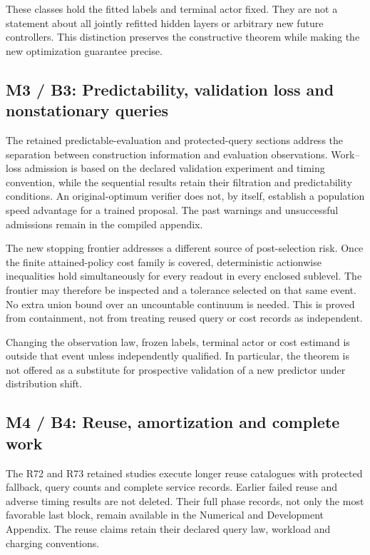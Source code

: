 \documentclass[ecta,nameyear,draft]{econsocart}
\begin{document}
These classes hold the fitted labels and terminal actor fixed. They are
not a statement about all jointly refitted hidden layers or arbitrary
new future controllers. This distinction preserves the constructive
theorem while making the new optimization guarantee precise.

\hypertarget{m3-b3-predictability-validation-loss-and-nonstationary-queries}{%
\subsection{M3 / B3: Predictability, validation loss and nonstationary
queries}\label{m3-b3-predictability-validation-loss-and-nonstationary-queries}}

The retained predictable-evaluation and protected-query sections address
the separation between construction information and evaluation
observations. Work--loss admission is based on the declared validation
experiment and timing convention, while the sequential results retain
their filtration and predictability conditions. An original-optimum
verifier does not, by itself, establish a population speed advantage for
a trained proposal. The past warnings and unsuccessful admissions remain
in the compiled appendix.

The new stopping frontier addresses a different source of post-selection
risk. Once the finite attained-policy cost family is covered,
deterministic actionwise inequalities hold simultaneously for every
readout in every enclosed sublevel. The frontier may therefore be
inspected and a tolerance selected on that same event. No extra union
bound over an uncountable continuum is needed. This is proved from
containment, not from treating reused query or cost records as
independent.

Changing the observation law, frozen labels, terminal actor or cost
estimand is outside that event unless independently qualified. In
particular, the theorem is not offered as a substitute for prospective
validation of a new predictor under distribution shift.

\hypertarget{m4-b4-reuse-amortization-and-complete-work}{%
\subsection{M4 / B4: Reuse, amortization and complete
work}\label{m4-b4-reuse-amortization-and-complete-work}}

The R72 and R73 retained studies execute longer reuse catalogues with
protected fallback, query counts and complete service records. Earlier
failed reuse and adverse timing results are not deleted. Their full
phase records, not only the most favorable last block, remain available
in the Numerical and Development Appendix. The reuse claims retain their
declared query law, workload and charging conventions.
\end{document}
